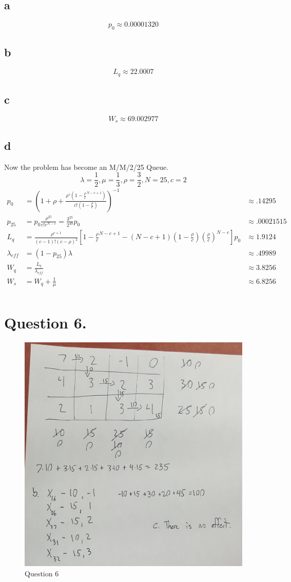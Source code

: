 \documentclass[10pt, letterpaper]{paper}
\begin{document}
\subsection*{a}
$$p_0 \approx 0.00001320$$
\subsection*{b}
$$L_q \approx 22.0007$$
\subsection*{c}
$$W_s \approx 69.002977$$
\subsection*{d}
Now the problem has become an M/M/2/25 Queue.
$$\lambda = \frac{1}{2}, \mu = \frac{1}{3}, \rho = \frac{3}{2}, N = 25, c = 2$$
\begin{equation*}
\begin{alignedat}{2}
p_0 &= ( 1 + \rho + \frac{ \rho^s ( 1 - \frac{\rho}{c}^{N-c+1} ) }{ c! ( 1 - \frac{ \rho }{c})})^{-1} &\approx .14295\\
p_{25} &= p_0 \frac{ \rho^{25} }{ c! c^{N-c} } = \frac{3^{25}}{2^{49}} p_0 &\approx .00021515\\
L_q &= \frac{ \rho^{c+1} }{ (c-1)!(c-\rho)^2}[ 1 - \frac{ \rho}{c}^{N-c+1} - (N-c+1)(1-\frac{\rho}{c})(\frac{ \rho}{c})^{N-c} ]p_0 &\approx 1.9124\\
\lambda_{eff} &= (1-p_{25})\lambda &\approx .49989\\
W_q &= \frac{ L_q}{\lambda_{eff}} &\approx 3.8256\\
W_s &= W_q + \frac{ 1}{\mu} &\approx 6.8256\\
\end{alignedat}
\end{equation*}

\section*{Question 6.}
\begin{figure}[H]
\centering
\includegraphics[width=1.0\textwidth]{Resized_20171130_191552.jpeg}
\caption{ Question 6 }
\end{figure}
\end{document}
